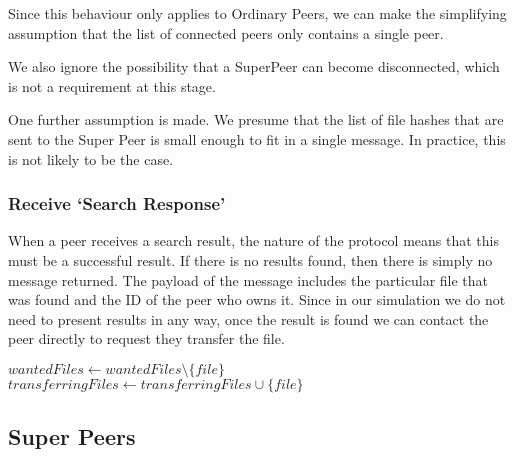 Since this behaviour only applies to Ordinary Peers, we can make the simplifying
assumption that the list of connected peers only contains a single peer.

We also ignore the possibility that a SuperPeer can become disconnected, which
is not a requirement at this stage.

One further assumption is made.  We presume that the list of file hashes that
are sent to the Super Peer is small enough to fit in a single message. In
practice, this is not likely to be the case.

\begin{algorithm}[H]

  \;
\end{algorithm}

\subsubsection{Receive `Search Response'}

When a peer receives a search result, the nature of the protocol means that this
must be a successful result. If there is no results found, then there is simply
no message returned.  The payload of the message includes the particular file
that was found and the ID of the peer who owns it.  Since in our simulation we
do not need to present results in any way, once the result is found we can
contact the peer directly to request they transfer the file.

\begin{algorithm}[H]

  $wantedFiles \leftarrow wantedFiles \setminus \{file\}$\;
  \;
  $transferringFiles \leftarrow transferringFiles \cup \{file\}$\;
\end{algorithm}


\subsection{Super Peers}


